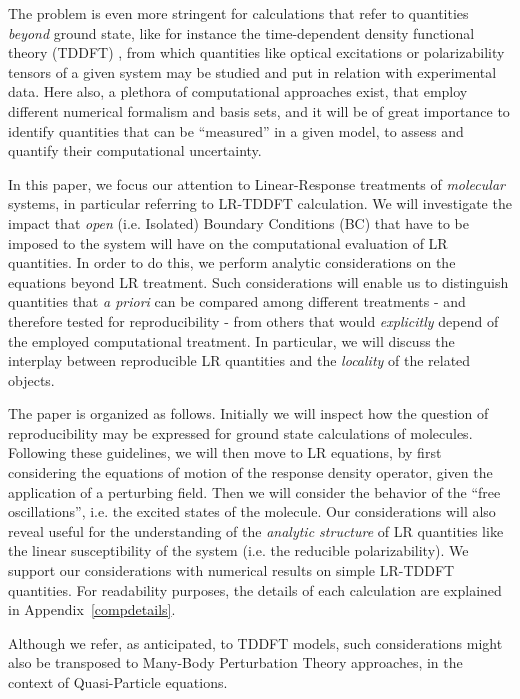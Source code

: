 \documentclass[reprint,aps,prb]{revtex4-1}
\begin{document}
The problem is even more stringent for calculations that refer to quantities \emph{beyond} ground state, like
for instance the time-dependent density functional theory (TDDFT) \cite{casida1995,runge1984,onida2002},
from which quantities like optical excitations or polarizability tensors
of a given system may be studied and put in relation with experimental data.
Here also, a plethora of computational approaches exist, that employ different numerical formalism and
basis sets, and it will be of great importance to identify quantities that can be ``measured'' in a given model, to assess
and quantify their computational uncertainty.

In this paper, we focus our attention to Linear-Response treatments of \emph{molecular} systems,
in particular referring to LR-TDDFT calculation. We will investigate the impact that
\emph{open} (i.e. Isolated) Boundary Conditions (BC) that have to be imposed to the system will have on the computational evaluation of LR quantities.
In order to do this, we perform analytic considerations on the equations beyond LR treatment.
Such considerations will enable us to distinguish quantities that \textit{a priori} can be compared among different treatments - and therefore tested for reproducibility -
from others that would \emph{explicitly} depend of the employed computational treatment.
In particular, we will discuss the interplay between reproducible LR quantities and the \emph{locality} of the related objects.

The paper is organized as follows.
Initially we will inspect how the question of reproducibility may be expressed
for ground state calculations of molecules.
Following these guidelines, we will then move to LR equations,
by first considering the equations of motion of the response density operator, given
the application of a perturbing field.
Then we will consider the behavior of the ``free oscillations'', i.e. the excited states
of the molecule.
Our considerations will also reveal useful for the understanding of the \emph{analytic structure} of LR quantities like
the linear susceptibility of the system (i.e. the reducible polarizability).
We support our considerations with numerical results on simple LR-TDDFT quantities.
For readability purposes, the details of each calculation are explained in Appendix~\ref{compdetails}.

Although we refer, as anticipated, to TDDFT models, such considerations might also be transposed to Many-Body Perturbation Theory
approaches, in the context of Quasi-Particle equations.
\end{document}
